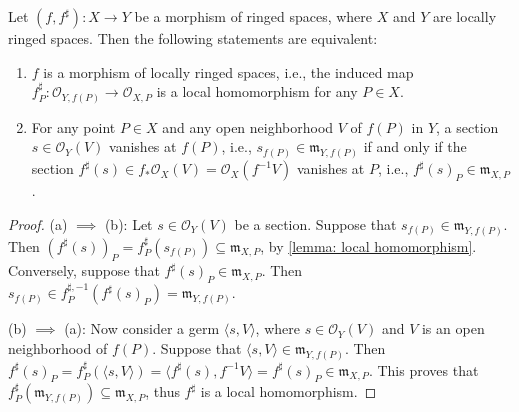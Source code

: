 \documentclass[11pt]{article}
\begin{document}
\begin{lemma}
  \label{lemma: induced local homomorphism}
  \cite{EisenbudHarris}
  Let $ (f,f^{\sharp}): X \to Y $ be a morphism of ringed spaces, where $ X $ and $ Y $ are locally ringed 
  spaces. Then the following statements are equivalent: 
  \begin{enumerate}[label = (\alph*)]
    \item $ f $ is a morphism of locally ringed spaces, i.e., the induced map 
  $ f_{P}^{\sharp} : \mathscr{O}_{Y,f(P)} \to \mathscr{O}_{X,P} $ is a local homomorphism for any $ P \in X $.  
    \item For any point $ P \in X $ and any open neighborhood $ V $ of $ f(P) $ in $ Y $, a section 
    $ s \in \mathscr{O}_{Y}(V) $ vanishes at $ f(P) $, i.e., $ s_{f(P)} \in \mathfrak{m}_{Y,f(P)} $ 
    if and only if the section 
    $ f^{\sharp}(s) \in f_{*}\mathscr{O}_{X}(V)=\mathscr{O}_{X}(f^{-1}V) $ vanishes at $ P $, 
    i.e., $ f^{\sharp}(s)_{P} \in \mathfrak{m}_{X,P}$.  
  \end{enumerate}
\end{lemma}

\begin{proof}
  (a) $ \implies $ (b): 
  Let $ s \in \mathscr{O}_{Y}(V) $ be a section. Suppose that  
  $ s_{f(P)} \in \mathfrak{m}_{Y,f(P)} $. 
  Then $ (f^{\sharp}(s))_{P} = f^{\sharp}_{P}(s_{f(P)}) \subseteq \mathfrak{m}_{X,P} $, 
  by \autoref{lemma: local homomorphism}. 
  Conversely, suppose that $ f^{\sharp}(s)_{P} \in \mathfrak{m}_{X,P} $. 
  Then $ s_{f(P)} \in f^{\sharp,-1}_{P}(f^{\sharp}(s)_{P}) = \mathfrak{m}_{Y,f(P)} $. 

  (b) $ \implies  $ (a): 
  Now consider a germ $ \langle s,V \rangle $, where $ s \in \mathscr{O}_{Y}(V) $ 
  and $ V $ is an open neighborhood of $ f(P) $. 
  Suppose that $ \langle s,V \rangle \in \mathfrak{m}_{Y,f(P)} $. 
  Then $ f^{\sharp}(s)_{P}= f^{\sharp}_{P}(\langle s,V \rangle)=\langle f^{\sharp}(s),f^{-1}V \rangle = f^{\sharp}(s)_{P} \in \mathfrak{m}_{X,P}$. 
  This proves that $ f^{\sharp}_{P}(\mathfrak{m}_{Y,f(P)}) \subseteq \mathfrak{m}_{X,P} $, 
  thus $ f^{\sharp} $ is a local homomorphism. 
\end{proof}
\end{document}
